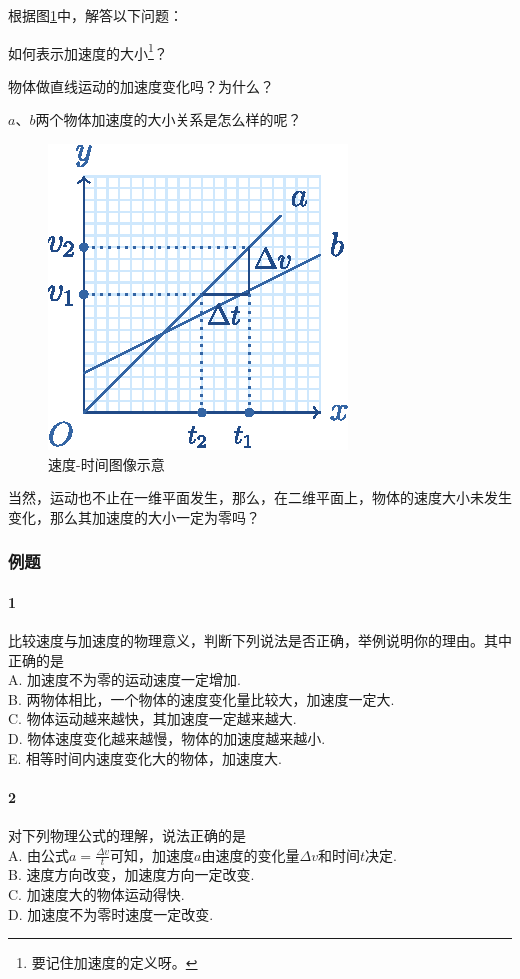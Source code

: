 					根据图\ref{Pic::速度-时间图像示意}中，解答以下问题：
					\begin{enumc}
						\item 如何表示加速度的大小\footnote{要记住加速度的定义呀。}？
						\item 物体做直线运动的加速度变化吗？为什么？
						\item $a$、$b$两个物体加速度的大小关系是怎么样的呢？
					\end{enumc}
					\begin{figure}
						\begin{center}
							\includegraphics[]{PIC/007.eps}
							\caption{速度-时间图像示意}
							\label{Pic::速度-时间图像示意}
						\end{center}
					\end{figure}

					当然，运动也不止在一维平面发生，那么，在二维平面上，物体的速度大小未发生变化，那么其加速度的大小一定为零吗？

				\subsubsection{例题}
					\paragraph{1}比较速度与加速度的物理意义，判断下列说法是否正确，举例说明你的理由。其中正确的是\mathc\\
					A. 加速度不为零的运动速度一定增加.\\
					B. 两物体相比，一个物体的速度变化量比较大，加速度一定大.\\
					C. 物体运动越来越快，其加速度一定越来越大.\\
					D. 物体速度变化越来越慢，物体的加速度越来越小.\\
					E. 相等时间内速度变化大的物体，加速度大.\\

					\paragraph{2}对下列物理公式的理解，说法正确的是\mathc\\
					A. 由公式$a=\frac{\Delta v}{t}$可知，加速度$a$由速度的变化量$\Delta v$和时间$t$决定.\\
					B. 速度方向改变，加速度方向一定改变.\\
					C. 加速度大的物体运动得快.\\
					D. 加速度不为零时速度一定改变.\\

